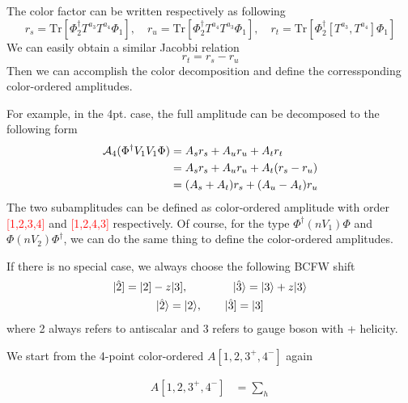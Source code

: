 \documentclass[12pt]{article}
\numberwithin{equation}{section}
\newcommand{\aket}[1]{|#1\rangle}
\newcommand{\sket}[1]{|#1]}
\begin{document}
    The color factor can be written respectively as following
    \begin{equation*}
        r_s=\mathrm{Tr}[\Phi_2^\dagger T^{a_3}T^{a_4}\Phi_1],\quad r_u=\mathrm{Tr}[\Phi_2^\dagger T^{a_4}T^{a_3}\Phi_1],\quad
        r_t=\mathrm{Tr}[\Phi_2^\dagger [T^{a_3},T^{a_4}]\Phi_1]
    \end{equation*}
    We can easily obtain a similar Jacobbi relation
    \begin{equation}
        r_t=r_s-r_u
    \end{equation}
    Then we can accomplish the color decomposition and define the corressponding color-ordered amplitudes.

    For example, in the 4pt. case, the full amplitude can be decomposed to the following form
        \begin{align}
            \mathcal{A}_4(\Phi^\dagger V_1V_1\Phi)&=A_s r_s+A_u r_u+A_t r_t\notag \\
            &=A_s r_s+A_u r_u+A_t(r_s-r_u)\notag\\
            &=(A_s+A_t)r_s+(A_u-A_t)r_u
        \end{align}
        The two subamplitudes can be defined as color-ordered amplitude with order \textcolor{red}{[1,2,3,4]} and 
        \textcolor{red}{[1,2,4,3]} respectively.
        Of course, for the type $\Phi^\dagger(nV_1)\Phi$ and $\Phi (nV_2) \Phi^\dagger$, we can do the same thing to define the color-ordered amplitudes.
    
    If there is no special case, we always choose the following BCFW shift
        \begin{gather}
            \sket{\hat{2}}=\sket{2}-z\sket{3},\qquad \qquad \aket{\hat{3}}=\aket{3}+z\aket{3}\notag\\
            \aket{\hat{2}}=\aket{2}, \qquad \sket{\hat{3}}=\sket{3}
        \end{gather}
    where 2 always refers to antiscalar and 3 refers to gauge boson with + helicity.

    We start from the 4-point color-ordered $A[1,2,3^+,4^-]$ again
    \begin{center}
    \begin{minipage}{0.45\textwidth}
        \begin{align*}
        A[1,2,3^+,4^-] &= \sum_{h}
        \end{align*}
        \end{minipage}
        \hspace{-3em}
        \begin{minipage}{0.45\textwidth}
        \end{minipage}
    \end{center}
\end{document}
